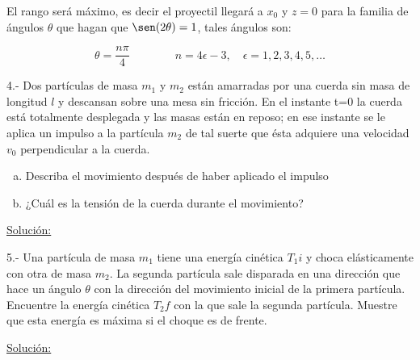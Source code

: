 \documentclass[a4paper,10pt]{article}
\begin{document}
El rango será máximo, es decir el proyectil llegará a $x_0$ y $z=0$ para
la familia de ángulos $\theta$ que hagan que $\sen(2\theta)=1$, tales
ángulos son:

\begin{equation}
 \theta = \frac{n\pi}{4} \qquad \qquad n = 4\epsilon - 3, \quad  \epsilon = 1,2,3,4,5,\dots
 \label{eq:9}
\end{equation}

















\vspace{.3cm}

4.- Dos partículas de masa $m_1$ y $m_2$ están amarradas por una cuerda sin masa de 
longitud $l$ y descansan sobre una mesa sin fricción. En el instante t=0 la cuerda
está totalmente desplegada y las masas están en reposo; en ese instante se le aplica
un impulso a la partícula $m_2$ de tal suerte que ésta adquiere una velocidad $v_0$ 
perpendicular a la cuerda.

\begin{enumerate}[a)]
 \item Describa el movimiento después de haber aplicado el impulso
 \item ¿Cuál es la tensión de la cuerda durante el movimiento?
\end{enumerate}

\vspace{.3cm}

\underline{Solución:}

\vspace{.3cm}

5.- Una partícula de masa $m_1$ tiene una energía cinética $T_1i$ y choca elásticamente 
con otra de masa $m_2$. La segunda partícula sale disparada en una dirección que hace un
ángulo $\theta$ con la dirección del movimiento inicial de la primera partícula. Encuentre
la energía cinética $T_2f$ con la que sale la segunda partícula. Muestre que esta energía
es máxima si el choque es de frente.

\vspace{.3cm}

\underline{Solución:}

\vspace{.3cm}
\end{document}
